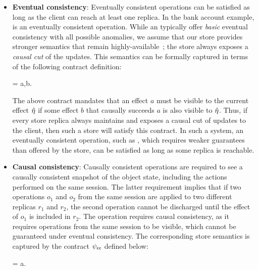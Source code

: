 \begin{itemize}

\item \textbf{Eventual consistency}: Eventually consistent operations can
	be satisfied as long as the client can reach at least one replica. In the
	bank account example,  is an eventually consistent operation.
	While an \ecds typically offer \emph{basic} eventual consistency with all
	possible anomalies, we assume that our store provides stronger semantics that
	remain highly-available~\cite{BailisHAT,COPS}; the store always exposes a
	\emph{causal cut} of the updates. This semantics can be formally captured in
	terms of the following contract definition:

  \vspace{-1mm}
  \begin{cmathpar}
  \ecc = \forall a,b. ~ \wedge {} \Rightarrow {}
  \end{cmathpar}

  The above contract mandates that an effect $a$ must be visible to the current
  effect $\hat{\eta}$ if some effect $b$ that causally succeeds $a$ is also visible
  to $\hat{\eta}$. Thus, if every store replica always maintains and exposes a
  causal cut of updates to the client, then such a store will satisfy this
  contract. In such a system, an eventually consistent operation, such as
  , which requires weaker guarantees than offered by the store, can
  be satisfied as long as some replica is reachable.

\item \textbf{Causal consistency}: Causally consistent operations are required
	to see a causally consistent snapshot of the object state, including the
	actions performed on the same session.  The latter requirement implies that
	if two operations $o_1$ and $o_2$ from the same session are applied to two
	different replicas $r_1$ and $r_2$, the second operation cannot be discharged
	until the effect of $o_1$ is included in $r_2$. The  operation
	requires causal consistency, as it requires operations from the same
	session to be visible, which cannot be guaranteed under eventual consistency.
	The corresponding store semantics is captured by the contract $\psi_{\sf cc}$ defined
	below:

  \vspace{-1mm}
  \begin{cmathpar}
  \ccc = \forall a.~ \Rightarrow {}
  \end{cmathpar}


\end{itemize}

